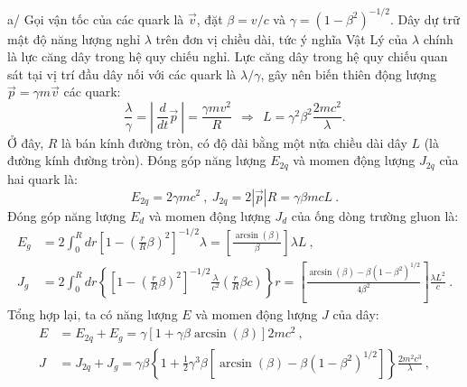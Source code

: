 \begin{enumerate}
    a/ Gọi vận tốc của các quark là $\vec{v}$, đặt $\beta = v/c$ và $\gamma =  \left(1-\beta^2\right)^{-1/2}$. Dây dự trữ mật độ năng lượng nghỉ $\lambda$ trên đơn vị chiều dài, tức ý nghĩa Vật Lý của $\lambda$ chính là lực căng dây trong hệ quy chiếu nghỉ. Lực căng dây trong hệ quy chiếu quan sát tại vị trí đầu dây nối với các quark là $\lambda/\gamma$, gây nên biến thiên động lượng $\vec{p} =  \gamma m \vec{v}$ các quark:
    \begin{equation} \label{eq1_String_theory}
        \frac{\lambda}{\gamma} = \left| \ \frac{d}{dt} \vec{p} \ \right| = \frac{\gamma m v^2}{R} \ \ \Longrightarrow \  \ L  = \gamma^2 \beta^2 \frac{2mc^2}{\lambda} .
    \end{equation}
    Ở đây, $R$ là bán kính đường tròn, có độ dài bằng một nửa chiều dài dây $L$ (là đường kính đường tròn). Đóng góp năng lượng $E_{2q}$ và momen động lượng $J_{2q}$ của hai quark là:
    \begin{equation} \label{eq2_String_theory}
       E_{2q} = 2\gamma mc^2 \ , \ J_{2q} = 2 |\vec{p}| R = \gamma \beta m c L  \ .
    \end{equation}
    Đóng góp năng lượng $E_{d}$ và momen động lượng $J_{d}$ của ống dòng trường gluon là:
    \begin{equation} \label{eq3_String_theory}
    \begin{split}
       E_{g} & = 2 \int_0^R dr \left[ 1 - \left( \frac{r}{R}\beta \right)^2 \right]^{-1/2} \lambda = \left[ \frac{\arcsin(\beta)}{\beta} \right] \lambda L  \ ,
       \\
       J_{g} & = 2 \int_0^R dr \left\{ \left[ 1 - \left( \frac{r}{R}\beta \right)^2 \right]^{-1/2} \frac{\lambda}{c^2} \left( \frac{r}{R}\beta c \right) \right\} r = \left[ \frac{\arcsin(\beta) - \beta \left( 1-\beta^2 \right)^{1/2}}{4\beta^2} \right] \frac{\lambda L^2}{c} \ .
       \end{split}
    \end{equation}
    Tổng hợp lại, ta có năng lượng $E$ và momen động lượng $J$ của dây:
    \begin{equation} \label{eq4_String_theory}
    \begin{split}
    E &= E_{2q} + E_{g} =  \gamma \left[ 1 + \gamma \beta \arcsin(\beta) \right] 2 mc^2 \ ,
    \\
    J &= J_{2q} + J_{g} = \gamma \beta \left\{ 1 + 
 \frac12 \gamma^3 \beta \left[ \arcsin(\beta) - \beta \left( 1-\beta^2 \right)^{1/2} \right] \right\} \frac{2m^2c^3}{\lambda} \ ,
    \end{split}
    \end{equation}

\end{enumerate}
